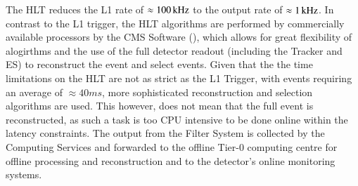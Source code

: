 The HLT reduces the L1 rate of $\approx 100\text{\,kHz}$ to the output rate of $\approx 1\text{\,kHz}$.
In contrast to the L1 trigger, the HLT algorithms are performed by commercially available processors by the CMS Software (\CMSSW), which allows for great flexibility of alogirthms and the use of the full detector readout (including the Tracker and ES) to reconstruct the event and select events.
Given that the the time limitations on the HLT are not as strict as the L1 Trigger, with events requiring an average of $\approx 40 ms$, more sophisticated reconstruction and selection algorithms are used.
This however, does not mean that the full event is reconstructed, as such a task is too CPU intensive to be done online within the latency constraints.
The output from the Filter System is collected by the Computing Services and forwarded to the offline Tier-0 computing centre for offline processing and reconstruction and to the detector's online monitoring systems.

